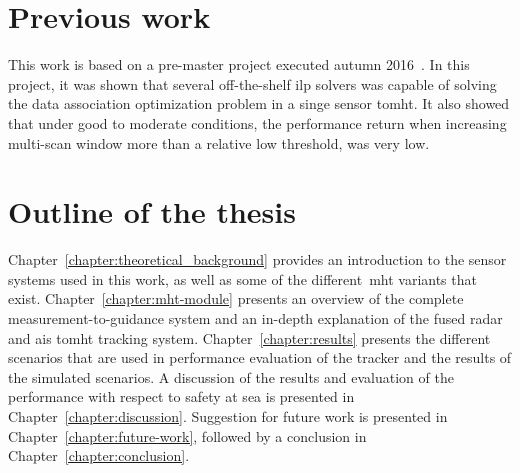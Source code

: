 \section{Previous work}\label{sec:previous_work}
This work is based on a pre-master project executed autumn 2016~\cite[url=true]{Liland_2017}. In this project, it was shown that several off-the-shelf \gls{ilp} \glspl{solver} was capable of solving the data association optimization problem in a singe sensor \gls{tomht}. It also showed that under good to moderate conditions, the performance return when increasing multi-scan window more than a relative low threshold, was very low.

\section{Outline of the thesis}\label{sec:outline_thesis}
Chapter~\ref{chapter:theoretical_background} provides an introduction to the sensor systems used in this work, as well as some of the different~\gls{mht} variants that exist. Chapter~\ref{chapter:mht-module} presents an overview of the complete measurement-to-guidance system and an in-depth explanation of the fused \gls{radar} and \gls{ais} \gls{tomht} tracking system. Chapter~\ref{chapter:results} presents the different scenarios that are used in performance evaluation of the tracker and the results of the simulated scenarios. A discussion of the results and evaluation of the performance with respect to safety at sea is presented in Chapter~\ref{chapter:discussion}. Suggestion for future work is presented in Chapter~\ref{chapter:future-work}, followed by a conclusion in Chapter~\ref{chapter:conclusion}.